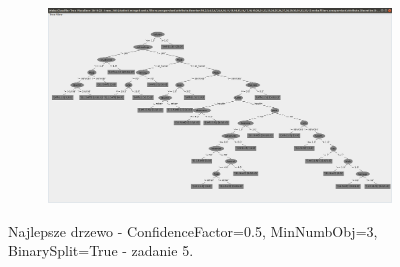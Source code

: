 \documentclass[12pt]{article}
\begin{document}
\clearpage
\begin{figure}[h!]
	\centering
	\begin{subfigure}[b]{1\linewidth}
		\includegraphics[width=\linewidth]{Drzewo_train_all.png}
	\end{subfigure}
	\label{fig:Chosen}
	\caption{Najlepsze drzewo - ConfidenceFactor=0.5, MinNumbObj=3, BinarySplit=True - zadanie 5.}
\end{figure}
\end{document}
